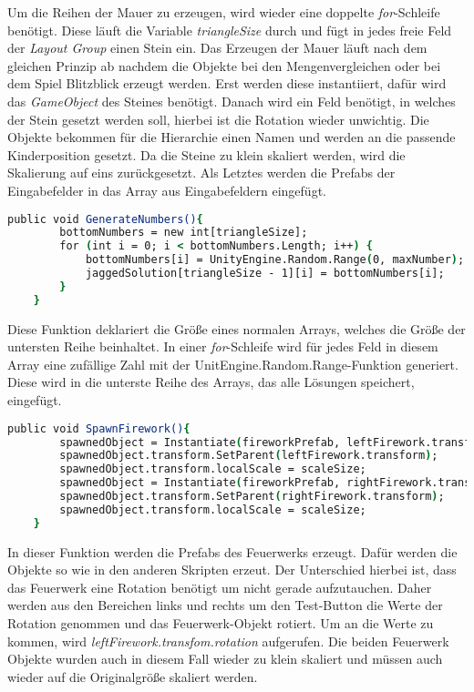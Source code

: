 Um die Reihen der Mauer zu erzeugen, wird wieder eine doppelte \textit{for}-Schleife benötigt. Diese läuft die Variable \textit{triangleSize} durch und fügt in jedes freie Feld der \textit{Layout Group} einen Stein ein. Das Erzeugen der Mauer läuft nach dem gleichen Prinzip ab nachdem die Objekte bei den Mengenvergleichen oder bei dem Spiel Blitzblick erzeugt werden. Erst werden diese instantiiert, dafür wird das \textit{GameObject} des Steines benötigt. Danach wird ein Feld benötigt, in welches der Stein gesetzt werden soll, hierbei ist die Rotation wieder unwichtig. Die Objekte bekommen für die Hierarchie einen Namen und werden an die passende Kinderposition gesetzt. Da die Steine zu klein skaliert werden, wird die Skalierung auf eins zurückgesetzt. Als Letztes werden die Prefabs der Eingabefelder in das Array aus Eingabefeldern eingefügt.\\
\begin{lstlisting}[language=csh, caption={Triangle.cs GenerateNumbers-Funktion}]
	public void GenerateNumbers(){
		bottomNumbers = new int[triangleSize];
		for (int i = 0; i < bottomNumbers.Length; i++) {
			bottomNumbers[i] = UnityEngine.Random.Range(0, maxNumber);
			jaggedSolution[triangleSize - 1][i] = bottomNumbers[i];
		}
	}
\end{lstlisting}
Diese Funktion deklariert die Größe eines normalen Arrays, welches die Größe der untersten Reihe beinhaltet. In einer \textit{for}-Schleife wird für jedes Feld in diesem Array eine zufällige Zahl mit der UnitEngine.Random.Range-Funktion generiert. Diese wird in die unterste Reihe des Arrays, das alle Lösungen speichert, eingefügt.\\
\begin{lstlisting}[language=csh, caption={Triangle.cs SpawnFirework-Funktion}]
	public void SpawnFirework(){
		spawnedObject = Instantiate(fireworkPrefab, leftFirework.transform.position, leftFirework.transform.rotation);
		spawnedObject.transform.SetParent(leftFirework.transform);
		spawnedObject.transform.localScale = scaleSize;
		spawnedObject = Instantiate(fireworkPrefab, rightFirework.transform.position, rightFirework.transform.rotation);
		spawnedObject.transform.SetParent(rightFirework.transform);
		spawnedObject.transform.localScale = scaleSize;
	}
\end{lstlisting}
In dieser Funktion werden die Prefabs des Feuerwerks erzeugt. Dafür werden die Objekte so wie in den anderen Skripten erzeut. Der Unterschied hierbei ist, dass das Feuerwerk eine Rotation benötigt um nicht gerade aufzutauchen. Daher werden aus den Bereichen links und rechts um den Test-Button die Werte der Rotation genommen und das Feuerwerk-Objekt rotiert. Um an die Werte zu kommen, wird \textit{leftFirework.transfom.rotation} aufgerufen. Die beiden Feuerwerk Objekte wurden auch in diesem Fall wieder zu klein skaliert und müssen auch wieder auf die Originalgröße skaliert werden.\\
